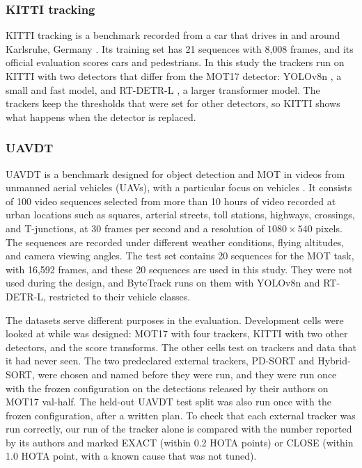 \subsubsection{KITTI tracking}
KITTI tracking is a benchmark recorded from a car that drives in and around Karlsruhe, Germany
\cite{geiger2012kitti}. Its training set has 21 sequences with 8,008 frames, and its official
evaluation scores cars and pedestrians. In this study the trackers run on KITTI with two detectors
that differ from the MOT17 detector: YOLOv8n \cite{jocher2023yolov8}, a small and fast model, and
RT-DETR-L \cite{zhao2024rtdetr}, a larger transformer model. The trackers keep the thresholds that
were set for other detectors, so KITTI shows what happens when the detector is replaced.

\subsubsection{UAVDT}
UAVDT is a benchmark designed for object detection and MOT in videos from unmanned aerial
vehicles (UAVs), with a particular focus on vehicles \cite{du2018uavdt}. It consists of 100 video
sequences selected from more than 10 hours of video recorded at urban locations such as squares,
arterial streets, toll stations, highways, crossings, and T-junctions, at 30 frames per second and
a resolution of $1080\times540$ pixels. The sequences are recorded under different weather
conditions, flying altitudes, and camera viewing angles. The test set contains 20 sequences for the
MOT task, with 16,592 frames, and these 20 sequences are used in this study. They were not used
during the design, and ByteTrack runs on them with YOLOv8n and RT-DETR-L, restricted to their
vehicle classes.

The datasets serve different purposes in the evaluation. Development cells were looked at while
\scl{} was designed: MOT17 with four trackers, KITTI with two other detectors, and the score
transforms. The other cells test \scl{} on trackers and data that it had never seen. The two
predeclared external trackers, PD-SORT and Hybrid-SORT, were chosen and named before they were
run, and they were run once with the frozen configuration on the detections released by their
authors on MOT17 val-half. The held-out UAVDT test split was also run once with the frozen
configuration, after a written plan. To check that each external tracker was run correctly, our run
of the tracker alone is compared with the number reported by its authors and marked EXACT (within
0.2 HOTA points) or CLOSE (within 1.0 HOTA point, with a known cause that was not tuned).

